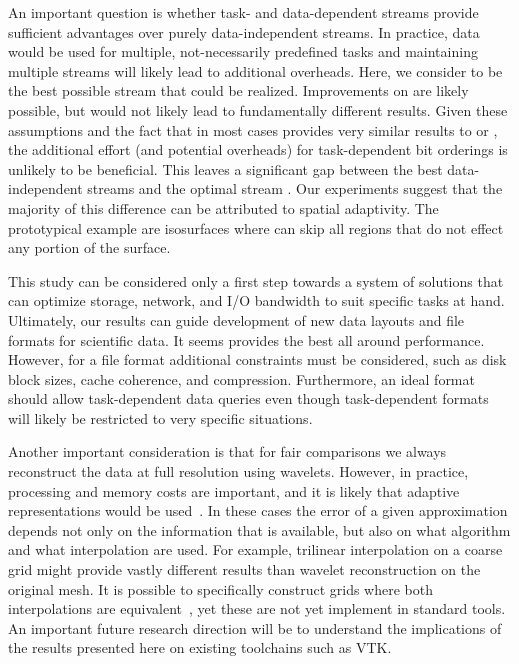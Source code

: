 An important question is whether task- and data-dependent streams provide sufficient advantages over
purely data-independent streams. In practice, data would be used for multiple, not-necessarily
predefined tasks and maintaining multiple streams will likely lead to additional overheads. Here, we
consider \ssig to be the best possible stream that could be realized. Improvements on \ssig are
likely possible, but would not likely lead to fundamentally different results. Given these
assumptions and the fact that \ssig in most cases provides very similar results to \sbit or \swav,
the additional effort (and potential overheads) for task-dependent bit orderings is unlikely to be
beneficial. This leaves a significant gap between the best data-independent streams and the optimal
stream \sopt. Our experiments suggest that the majority of this difference can be attributed to
spatial adaptivity. The prototypical example are isosurfaces where \sopt can skip all regions that
do not effect any portion of the surface.

This study can be considered only a first step towards a system of solutions that can optimize
storage, network, and I/O bandwidth to suit specific tasks at hand. Ultimately, our results can
guide development of new data layouts and file formats for scientific data. It seems \swav provides
the best all around performance. However, for a file format additional constraints must be
considered, such as disk block sizes, cache coherence, and compression. Furthermore, an ideal format
should allow task-dependent data queries even though task-dependent formats will likely be
restricted to very specific situations. 

Another important consideration is that for fair comparisons we always reconstruct the data at full
resolution using wavelets. However, in practice, processing and memory costs are important, and it
is likely that adaptive representations would be used~\cite{gigavoxels,Gobbetti2008,vdb2013}. In
these cases the error of a given approximation depends not only on the information that is
available, but also on what algorithm and what interpolation are used. For example, trilinear
interpolation on a coarse grid might provide vastly different results than wavelet reconstruction on
the original mesh. It is possible to specifically construct grids where both interpolations are
equivalent~\cite{weiss}, yet these are not yet implement in standard tools. An important future
research direction will be to understand the implications of the results presented here on existing
toolchains such as VTK.

